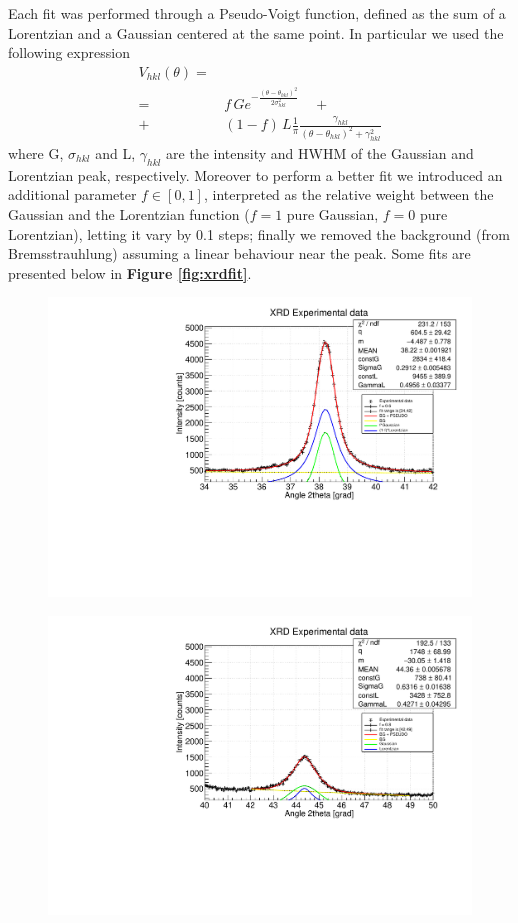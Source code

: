 \documentclass[twocolumn]{article}
\begin{document}
\begin{multicols}{2}
Each fit was performed through a Pseudo-Voigt function, defined as the sum of a Lorentzian  and a Gaussian centered at the same point. In particular we used the following expression
\begin{equation}
\begin{aligned}
    V_{hkl}(\theta)= &\\
    =& \,f\, G e^{-\frac{(\theta-\theta_{hkl})^2}{2\sigma_{hkl}^2}}\quad + \\
    +&\, (1-f)\, L\frac{1}{\pi}\frac{\gamma_{hkl}}{(\theta-\theta_{hkl})^2 + \gamma_{hkl}^2}
\end{aligned}
\label{pseudovoigt}
\end{equation}
where G, $\sigma_{hkl}$ and L, $\gamma_{hkl}$ are the intensity and HWHM of the Gaussian and Lorentzian peak, respectively. Moreover to perform a better fit we introduced an additional parameter $f \in [0,1]$, interpreted as the relative weight between the Gaussian and the Lorentzian function ($f=1$ pure Gaussian, $f=0$ pure Lorentzian), letting it vary by 0.1 steps; finally we removed the background (from Bremsstrauhlung) assuming a linear behaviour near the peak. Some fits are presented below in {\bf Figure \ref{fig:xrdfit}}. 
\begin{figure}[H]
    \centering
    \includegraphics[width=.5\textwidth]{image/data/111_f_06.pdf}
    \end{figure}
    
\begin{figure}[H]
    \centering
    \includegraphics[width=.5\textwidth]{image/data/200_f_08.pdf}
    \label{fits}
\end{figure}


\end{multicols}
\end{document}
